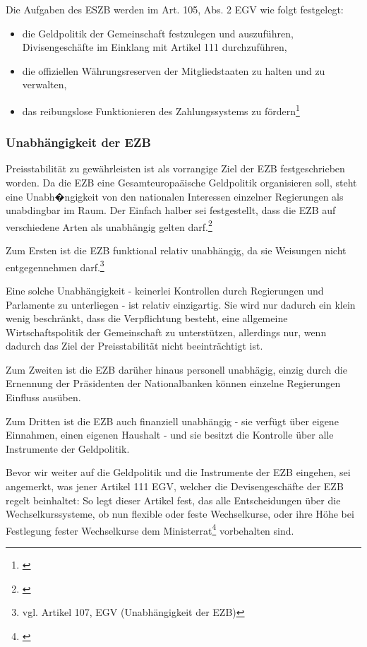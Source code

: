 \documentclass[
        onecolumn,
        a4paper,
        abstracton,
        parskip=half
        ,final
        ]{scrartcl}
\begin{document}
Die Aufgaben des ESZB werden im Art. 105, Abs. 2 EGV wie folgt festgelegt:
\begin{itemize}
 \item{die Geldpolitik der Gemeinschaft festzulegen und auszuf{\"u}hren, Divisengesch{\"a}fte im Einklang mit Artikel 111 durchzuf{\"u}hren,}
 \item{die offiziellen W{\"a}hrungsreserven der Mitgliedstaaten zu halten und zu verwalten,}
 \item{das reibungslose Funktionieren des Zahlungssystems zu f{\"o}rdern}\footnote[50]{\citep[vgl.][S.555]{Basseler2010}}
\end{itemize}

\subsubsection{Unabh{\"a}ngigkeit der EZB}

Preisstabilit{\"a}t zu gew{\"a}hrleisten ist als vorrangige Ziel der EZB festgeschrieben worden. Da die EZB eine Gesamteuropa{\"a}ische Geldpolitik organisieren soll, steht eine Unabh�ngigkeit von den nationalen Interessen einzelner Regierungen als unabdingbar im Raum. Der Einfach halber sei festgestellt, dass die EZB auf verschiedene Arten als unabh{\"a}ngig gelten darf.\footnote[51]{\citep[vgl.][S.555-557]{Basseler2010}}

Zum Ersten ist die EZB funktional relativ unabh{\"a}ngig, da sie Weisungen nicht entgegennehmen darf.\footnote[34]{vgl. Artikel 107, EGV (Unabh{\"a}ngigkeit der EZB)}

Eine solche Unabh{\"a}ngigkeit - keinerlei Kontrollen durch Regierungen und Parlamente zu unterliegen - ist relativ einzigartig. Sie wird nur dadurch ein klein wenig beschr{\"a}nkt, dass die Verpflichtung besteht, eine allgemeine Wirtschaftspolitik der Gemeinschaft zu unterst{\"u}tzen, allerdings nur, wenn dadurch das Ziel der Preisstabilit{\"a}t nicht beeintr{\"a}chtigt ist.

Zum Zweiten ist die EZB dar{\"u}her hinaus personell unabh{\"a}gig, einzig durch die Ernennung der Pr{\"a}sidenten der Nationalbanken k{\"o}nnen einzelne Regierungen Einfluss aus{\"u}ben.

Zum Dritten ist die EZB auch finanziell unabh{\"a}ngig - sie verf{\"u}gt {\"u}ber eigene Einnahmen, einen eigenen Haushalt - und sie besitzt die Kontrolle {\"u}ber alle Instrumente der Geldpolitik.

Bevor wir weiter auf die Geldpolitik und die Instrumente der EZB eingehen, sei angemerkt, was jener Artikel 111 EGV, welcher die Devisengesch{\"a}fte der EZB regelt beinhaltet:
So legt dieser Artikel fest, das alle Entscheidungen {\"u}ber die Wechselkurssysteme, ob nun flexible oder feste Wechselkurse, oder ihre H{\"o}he bei Festlegung fester Wechselkurse dem Ministerrat\footnote[52]{\citep[S.555]{Basseler2010}} vorbehalten sind.
\end{document}
